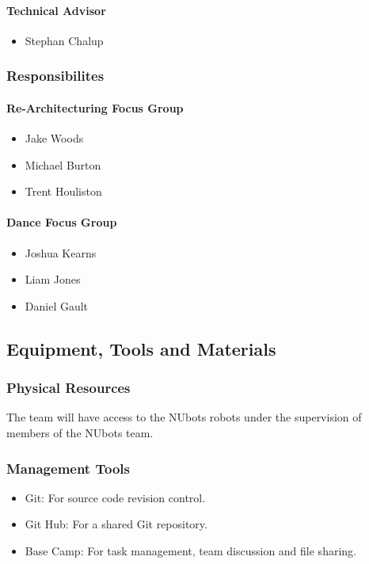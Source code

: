 \documentclass[english,12pt]{scrartcl}
\begin{document}
				\paragraph{Technical Advisor}
					\begin{itemize}
						\item Stephan Chalup
					\end{itemize}
			\subsubsection{Responsibilites}

				\paragraph{Re-Architecturing Focus Group}
					\begin{itemize}
						\item Jake Woods
						\item Michael Burton
						\item Trent Houliston
					\end{itemize}

				\paragraph{Dance Focus Group}
					\begin{itemize}
						\item Joshua Kearns
						\item Liam Jones
						\item Daniel Gault
					\end{itemize}

		\subsection{Equipment, Tools and Materials}
			\subsubsection{Physical Resources}
			The team will have access to the NUbots robots under the supervision of members of the NUbots team.
			\subsubsection{Management Tools}
				\begin{itemize}
					\item Git: For source code revision control.
					\item Git Hub: For a shared Git repository.
					\item Base Camp: For task management, team discussion and file sharing.
				\end{itemize}
\end{document}
